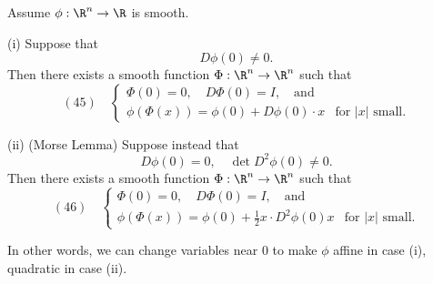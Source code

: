 \begin{lemma}
\label{lem:stationary-phase-changing-coordinates}
Assume $\phi : \R^n \to \R$ is smooth.

(i) Suppose that
$$D\phi(0) \neq 0.$$
Then there exists a smooth function $\Phi : \R^n \to \R^n$ such that
$$(45) \quad \begin{cases} \Phi(0) = 0, \quad D\Phi(0) = I, \quad \text{and} \\ \phi(\Phi(x)) = \phi(0) + D\phi(0) \cdot x & \text{for } |x| \text{ small}. \end{cases}$$

(ii) (Morse Lemma) Suppose instead that
$$D\phi(0) = 0, \quad \det D^2\phi(0) \neq 0.$$
Then there exists a smooth function $\Phi : \R^n \to \R^n$ such that
$$(46) \quad \begin{cases} \Phi(0) = 0, \quad D\Phi(0) = I, \quad \text{and} \\ \phi(\Phi(x)) = \phi(0) + \frac{1}{2} x \cdot D^2\phi(0) x & \text{for } |x| \text{ small}. \end{cases}$$

In other words, we can change variables near 0 to make $\phi$ affine in case (i), quadratic in case (ii).
\end{lemma}
